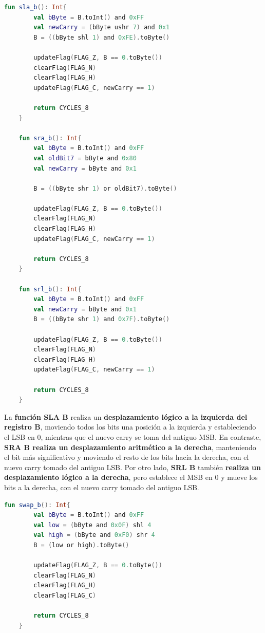 \begin{lstlisting}[language=Kotlin, caption={Operaciones SLA, SRA y SRL}, label={code:kotlinslasrasrl}]
    fun sla_b(): Int{
        val bByte = B.toInt() and 0xFF
        val newCarry = (bByte ushr 7) and 0x1
        B = ((bByte shl 1) and 0xFE).toByte()

        updateFlag(FLAG_Z, B == 0.toByte())
        clearFlag(FLAG_N)
        clearFlag(FLAG_H)
        updateFlag(FLAG_C, newCarry == 1)
        
        return CYCLES_8
    }

    fun sra_b(): Int{
        val bByte = B.toInt() and 0xFF
        val oldBit7 = bByte and 0x80
        val newCarry = bByte and 0x1

        B = ((bByte shr 1) or oldBit7).toByte()

        updateFlag(FLAG_Z, B == 0.toByte())
        clearFlag(FLAG_N)
        clearFlag(FLAG_H)
        updateFlag(FLAG_C, newCarry == 1)

        return CYCLES_8
    }

    fun srl_b(): Int{
        val bByte = B.toInt() and 0xFF
        val newCarry = bByte and 0x1
        B = ((bByte shr 1) and 0x7F).toByte()

        updateFlag(FLAG_Z, B == 0.toByte())
        clearFlag(FLAG_N)
        clearFlag(FLAG_H)
        updateFlag(FLAG_C, newCarry == 1)

        return CYCLES_8
    }
\end{lstlisting}

La \textbf{función SLA B} realiza un \textbf{desplazamiento lógico a la izquierda del registro B}, moviendo todos los bits una posición a la izquierda y estableciendo el LSB en 0, mientras que el nuevo carry se toma del antiguo MSB. En contraste, \textbf{SRA B realiza un desplazamiento aritmético a la derecha}, manteniendo el bit más significativo y moviendo el resto de los bits hacia la derecha, con el nuevo carry tomado del antiguo LSB. Por otro lado, \textbf{SRL B} también \textbf{realiza un desplazamiento lógico a la derecha}, pero establece el MSB en 0 y mueve los bits a la derecha, con el nuevo carry tomado del antiguo LSB.

\begin{lstlisting}[language=Kotlin, caption={Operación SWAP}, label={code:kotlinswap}]
    fun swap_b(): Int{
        val bByte = B.toInt() and 0xFF
        val low = (bByte and 0x0F) shl 4
        val high = (bByte and 0xF0) shr 4
        B = (low or high).toByte()

        updateFlag(FLAG_Z, B == 0.toByte())
        clearFlag(FLAG_N)
        clearFlag(FLAG_H)
        clearFlag(FLAG_C)

        return CYCLES_8
    }
\end{lstlisting}

